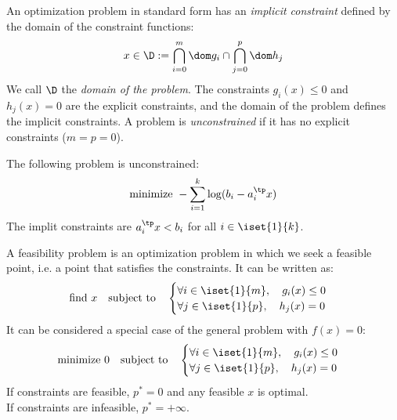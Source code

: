 \begin{remark}
    An optimization problem in standard form has an \emph{implicit constraint} defined by the domain of the constraint functions:
    \begin{equation*}
        x\in\D := \bigcap_{i=0}^m\dom g_i \cap \bigcap_{j=0}^p\dom h_j
    \end{equation*}
    We call $\D$ the \emph{domain of the problem}. The constraints $g_i(x)\leq0$ and $h_j(x)=0$ are the explicit constraints, and the domain of the problem defines the implicit constraints. A problem is \emph{unconstrained} if it has no explicit constraints ($m=p=0$).
\end{remark}

\begin{example}
    The following problem is unconstrained:
    \begin{equation*}
        \text{minimize } -\sum_{i=1}^k\log(b_i-a_i^\tp x)
    \end{equation*}
    The implit constraints are $a_i^\tp x<b_i$ for all $i\in\iset{1}{k}$.
\end{example}

\begin{definition}
    A feasibility problem is an optimization problem in which we seek a feasible point, i.e. a point that satisfies the constraints. It can be written as:
    \begin{equation*}
        \text{find } x \quad\text{subject to}\quad \begin{cases}
            \forall i\in\iset{1}{m}, \quad g_i(x)\leq 0\\
            \forall j\in\iset{1}{p}, \quad h_j(x) = 0
        \end{cases}
    \end{equation*}
    It can be considered a special case of the general problem with $f(x)=0$:
    \begin{equation*}
        \text{minimize } 0 \quad\text{subject to}\quad \begin{cases}
            \forall i\in\iset{1}{m}, \quad g_i(x)\leq 0\\
            \forall j\in\iset{1}{p}, \quad h_j(x) = 0
        \end{cases}
    \end{equation*}
    If constraints are feasible, $p^*=0$ and any feasible $x$ is optimal.\\
    If constraints are infeasible, $p^*=+\infty$.
\end{definition}

